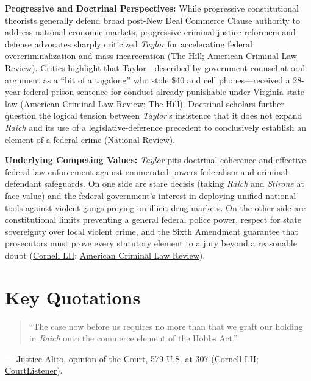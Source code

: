 \documentclass[12pt]{article}
\begin{document}
\textbf{Progressive and Doctrinal Perspectives:} While progressive constitutional theorists generally defend broad post-New Deal Commerce Clause authority to address national economic markets, progressive criminal-justice reformers and defense advocates sharply criticized \textit{Taylor} for accelerating federal overcriminalization and mass incarceration (\href{https://thehill.com/homenews/284991-supreme-courts-hobbs-act-ruling-means-increased-mass-incarceration/}{The Hill}; \href{https://www.law.georgetown.edu/american-criminal-law-review/wp-content/uploads/sites/15/2023/02/53-0-Evola-you-shall-go-no-further.pdf}{American Criminal Law Review}). Critics highlight that Taylor---described by government counsel at oral argument as a ``bit of a tagalong'' who stole \$40 and cell phones---received a 28-year federal prison sentence for conduct already punishable under Virginia state law (\href{https://www.law.georgetown.edu/american-criminal-law-review/wp-content/uploads/sites/15/2023/02/53-0-Evola-you-shall-go-no-further.pdf}{American Criminal Law Review}; \href{https://thehill.com/homenews/284991-supreme-courts-hobbs-act-ruling-means-increased-mass-incarceration/}{The Hill}). Doctrinal scholars further question the logical tension between \textit{Taylor}'s insistence that it does not expand \textit{Raich} and its use of a legislative-deference precedent to conclusively establish an element of a federal crime (\href{https://www.nationalreview.com/bench-memos/loose-evidentiary-ends-raich-taylor-v-united-states}{National Review}).

\textbf{Underlying Competing Values:} \textit{Taylor} pits doctrinal coherence and effective federal law enforcement against enumerated-powers federalism and criminal-defendant safeguards. On one side are stare decisis (taking \textit{Raich} and \textit{Stirone} at face value) and the federal government's interest in deploying unified national tools against violent gangs preying on illicit drug markets. On the other side are constitutional limits preventing a general federal police power, respect for state sovereignty over local violent crime, and the Sixth Amendment guarantee that prosecutors must prove every statutory element to a jury beyond a reasonable doubt (\href{https://www.law.cornell.edu/supremecourt/text/14-6166}{Cornell LII}; \href{https://www.law.georgetown.edu/american-criminal-law-review/wp-content/uploads/sites/15/2023/02/53-0-Evola-you-shall-go-no-further.pdf}{American Criminal Law Review}).

\section{Key Quotations}
\begin{quote}
``The case now before us requires no more than that we graft our holding in \textit{Raich} onto the commerce element of the Hobbs Act.''
\end{quote}
\noindent --- Justice Alito, opinion of the Court, 579 U.S. at 307 (\href{https://www.law.cornell.edu/supremecourt/text/14-6166}{Cornell LII}; \href{https://www.courtlistener.com/opinion/3214883/taylor-v-united-states/}{CourtListener}).
\end{document}

